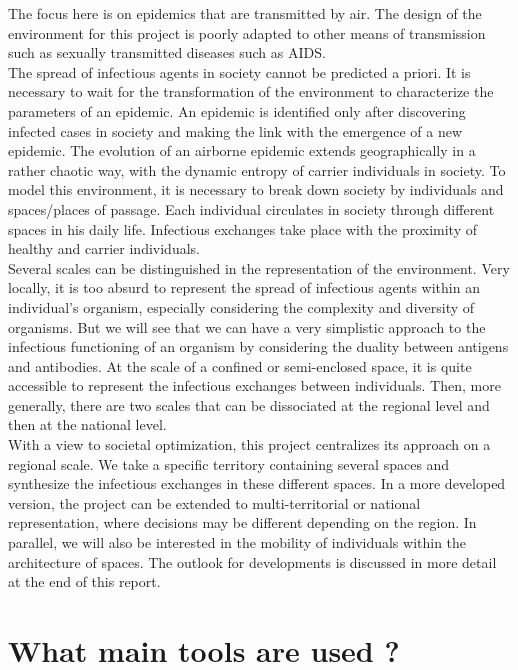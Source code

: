 The focus here is on epidemics that are transmitted by air. The design of the environment for this project is poorly adapted to other means of transmission such as sexually transmitted diseases such as AIDS.\\

The spread of infectious agents in society cannot be predicted a priori. It is necessary to wait for the transformation of the environment to characterize the parameters of an epidemic. An epidemic is identified only after discovering infected cases in society and making the link with the emergence of a new epidemic. The evolution of an airborne epidemic extends geographically in a rather chaotic way, with the dynamic entropy of carrier individuals in society. To model this environment, it is necessary to break down society by individuals and spaces/places of passage. Each individual circulates in society through different spaces in his daily life. Infectious exchanges take place with the proximity of healthy and carrier individuals.\\

Several scales can be distinguished in the representation of the environment. Very locally, it is too absurd to represent the spread of infectious agents within an individual's organism, especially considering the complexity and diversity of organisms. But we will see that we can have a very simplistic approach to the infectious functioning of an organism by considering the duality between antigens and antibodies. At the scale of a confined or semi-enclosed space, it is quite accessible to represent the infectious exchanges between individuals. Then, more generally, there are two scales that can be dissociated at the regional level and then at the national level.\\

With a view to societal optimization, this project centralizes its approach on a regional scale. We take a specific territory containing several spaces and synthesize the infectious exchanges in these different spaces. In a more developed version, the project can be extended to multi-territorial or national representation, where decisions may be different depending on the region. In parallel, we will also be interested in the mobility of individuals within the architecture of spaces. The outlook for developments is discussed in more detail at the end of this report.\\

\section*{What main tools are used ?}

